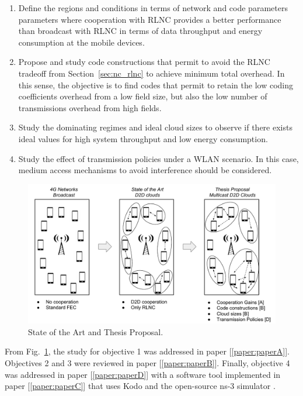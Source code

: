 \begin{enumerate}

\item Define the regions and conditions in terms of network and code parameters parameters where cooperation with \ac{RLNC} provides a better performance than broadcast with \ac{RLNC} in terms of data throughput and energy consumption at the mobile devices.

\item Propose and study code constructions that permit to avoid the \ac{RLNC} tradeoff from Section~\ref{sec:nc_rlnc} to achieve minimum total overhead. In this sense, the objective is to find codes that permit to retain the low coding coefficients overhead from a low field size, but also the low number of transmissions overhead from high fields.

\item Study the dominating regimes and ideal cloud sizes to observe if there exists ideal values for high system throughput and low energy consumption.

\item Study the effect of transmission policies under a \ac{WLAN} scenario. In this case, medium access mechanisms to avoid interference should be considered.
\end{enumerate}

\begin{figure}[h]
  \centering
  \includegraphics[width=\textwidth]{introduction/figures/thesis-diagrams.pdf}
  \caption{State of the Art and Thesis Proposal.}
\label{fig:proposal}
\end{figure}

From Fig.~\ref{fig:proposal}, the study for objective 1 was addressed in paper {[\ref{paper:paperA}]}. Objectives 2 and 3 were reviewed in paper {[\ref{paper:paperB}]}. Finally, objective 4 was addressed in paper {[\ref{paper:paperD}]} with a software tool implemented in paper {[\ref{paper:paperC}]} that uses Kodo and the open-source ns-3 simulator \cite{ns3link}.

\clearpage
